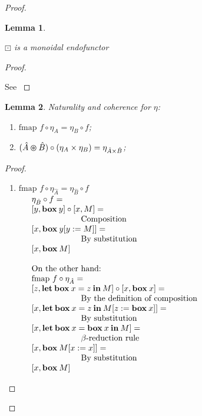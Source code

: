\documentclass[a4paper]{article}
\newtheorem{lemma}{Lemma}
\begin{document}
\begin{proof}
\begin{lemma}
  $ $

  $\boxdot$ is a monoidal endofunctor
\end{lemma}

\begin{proof}
$ $

See \cite{ModalK}
\end{proof}

\begin{lemma} Naturality and coherence for $\eta$:

\begin{enumerate}
  \item $\text{fmap } f \circ \eta_A = \eta_B \circ f$;
  \item $(\hat{A} \varoast \hat{B}) \circ (\eta_{A} \times \eta_{B}) = \eta_{\hat{A} \times \hat{B}}$;
\end{enumerate}
\end{lemma}

\begin{proof}
  $ $

\begin{enumerate}
\item $\text{fmap } f \circ \eta_{\hat{A}} = \eta_{\hat{B}} \circ f$ \\

$\begin{array}{lll}
&\eta_{\hat{B}} \circ f = & \\
&[y, {\bf box \:} y] \circ [x, M] = &\\
&\quad\quad\quad\quad\quad\quad \text{Composition} & \\
&[x, {\bf box \:} y [y := M]] = &\\
&\quad\quad\quad\quad\quad\quad \text{By substitution}& \\
&[x, {\bf box \:} M]& \\
& &\\
&\text{On the other hand:}& \\
&\text{fmap } f \circ \eta_{\hat{A}} = & \\
&[z, {\bf let \: box \:} x = z {\: \bf in \:} M] \circ [x, {\bf box \:} x] = &\\
&\quad\quad\quad\quad\quad\quad \text{By the definition of composition}& \\
&[x, {\bf let \: box \:} x = z {\: \bf in \:} M [z := {\bf box \:} x]] = & \\
&\quad\quad\quad\quad\quad\quad \text{By substitution}& \\
&[x, {\bf let \: box \:} x = {\bf box \:} x {\: \bf in \:} M] = & \\
&\quad\quad\quad\quad\quad\quad \text{$\beta$-reduction rule}& \\
&[x, {\bf box \:} M [x := x]] = &\\
&\quad\quad\quad\quad\quad\quad \text{By substitution} & \\
&[x, {\bf box \:} M]&
\end{array}$


\end{enumerate}
\end{proof}
\end{proof}
\end{document}

